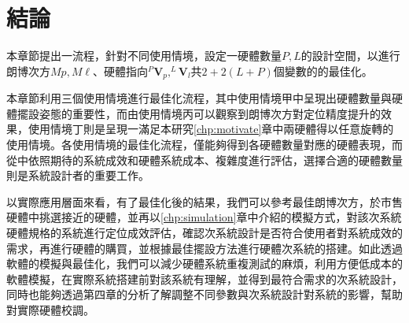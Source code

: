 




\section{結論}
\label{chp:5_conclu}

本章節提出一流程，針對不同使用情境，設定一硬體數量$P,L$的設計空間，以進行朗博次方$Mp,M\ell$、硬體指向$^{P}\boldsymbol{V}_p,^{L}\boldsymbol{V}_l$共$2+2(L+P)$個變數的的最佳化。


本章節利用三個使用情境進行最佳化流程，其中使用情境甲中呈現出硬體數量與硬體擺設姿態的重要性，而由使用情境丙可以觀察到朗博次方對定位精度提升的效果，使用情境丁則是呈現一滿足本研究\ref{chp:motivate}章中兩硬體得以任意旋轉的使用情境。各使用情境的最佳化流程，僅能夠得到各硬體數量對應的硬體表現，而從中依照期待的系統成效和硬體系統成本、複雜度進行評估，選擇合適的硬體數量則是系統設計者的重要工作。

以實際應用層面來看，有了最佳化後的結果，我們可以參考最佳朗博次方，於市售硬體中挑選接近的硬體，並再以\ref{chp:simulation}章中介紹的模擬方式，對該次系統硬體規格的系統進行定位成效評估，確認次系統設計是否符合使用者對系統成效的需求，再進行硬體的購買，並根據最佳擺設方法進行硬體次系統的搭建。如此透過軟體的模擬與最佳化，我們可以減少硬體系統重複測試的麻煩，利用方便低成本的軟體模擬，在實際系統搭建前對該系統有理解，並得到最符合需求的次系統設計，同時也能夠透過第四章的分析了解調整不同參數與次系統設計對系統的影響，幫助對實際硬體校調。













